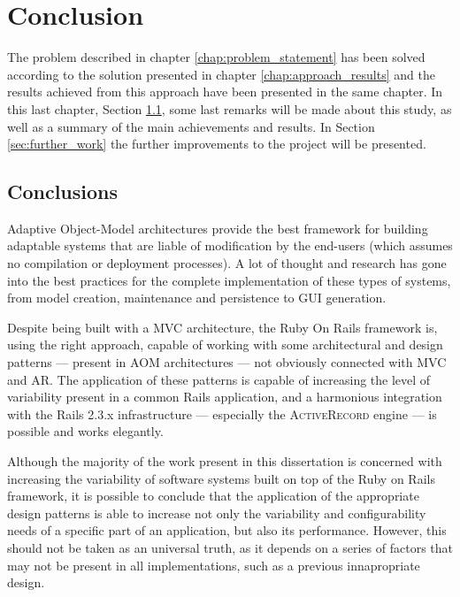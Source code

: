 \chapter{Conclusion}\label{chap:conclusion}

The problem described in chapter \ref{chap:problem_statement} has been solved according to the solution presented in chapter \ref{chap:approach_results} and the results achieved from this approach have been presented in the same chapter. In this last chapter, Section \ref{sec:conclusions}, some last remarks will be made about this study, as well as a summary of the main achievements and results. In Section \ref{sec:further_work} the further improvements to the project will be presented.

\section{Conclusions}\label{sec:conclusions}

Adaptive Object-Model architectures provide the best framework for building adaptable systems that are liable of modification by the end-users (which assumes no compilation or deployment processes). A lot of thought and research has gone into the best practices for the complete implementation of these types of systems, from model creation, maintenance and persistence to GUI generation.

Despite being built with a MVC architecture, the Ruby On Rails framework is, using the right approach, capable of working with some architectural and design patterns --- present in AOM architectures --- not obviously connected with MVC and AR. The application of these patterns is capable of increasing the level of variability present in a common Rails application, and a harmonious integration with the Rails 2.3.x infrastructure --- especially the \textsc{ActiveRecord} engine --- is possible and works elegantly.

Although the majority of the work present in this dissertation is concerned with increasing the variability of software systems built on top of the Ruby on Rails framework, it is possible to conclude that the application of the appropriate design patterns is able to increase not only the variability and configurability needs of a specific part of an application, but also its performance. However, this should not be taken as an universal truth, as it depends on a series of factors that may not be present in all implementations, such as a previous innapropriate design.

